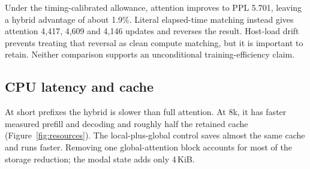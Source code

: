 \documentclass[11pt,letterpaper]{article}
\begin{document}
Under the timing-calibrated allowance, attention improves to PPL 5.701, leaving a hybrid advantage of about 1.9\%. Literal elapsed-time matching instead gives attention 4,417, 4,609 and 4,146 updates and reverses the result. Host-load drift prevents treating that reversal as clean compute matching, but it is important to retain. Neither comparison supports an unconditional training-efficiency claim.

\subsection{CPU latency and cache}
At short prefixes the hybrid is slower than full attention. At 8k, it has faster measured prefill and decoding and roughly half the retained cache (Figure~\ref{fig:resources}). The local-plus-global control saves almost the same cache and runs faster. Removing one global-attention block accounts for most of the storage reduction; the modal state adds only 4\,KiB.
\end{document}
